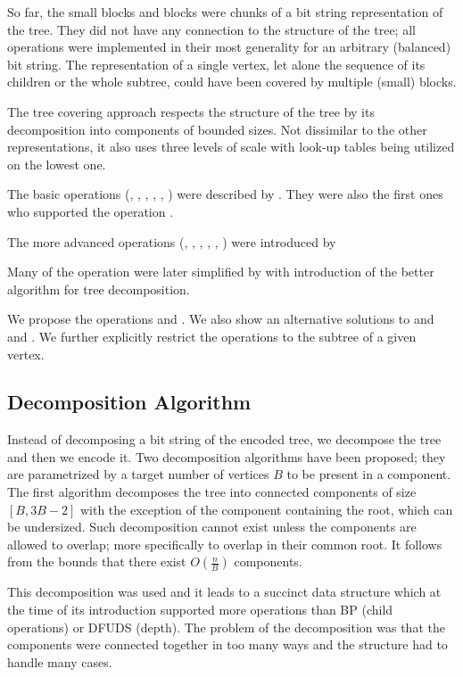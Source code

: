 So far, the small blocks and blocks were chunks of a bit string representation of the tree.
They did not have any connection to the structure of the tree; all operations were implemented in their most generality for an arbitrary (balanced) bit string.
The representation of a single vertex, let alone the sequence of its children or the whole subtree, could have been covered by multiple (small) blocks.

The tree covering approach respects the structure of the tree by its decomposition into components of bounded sizes.
Not dissimilar to the other representations, it also uses three levels of scale with look-up tables being utilized on the lowest one.

\bigbreak

The basic operations (\childAny{}, \degree{}, \dep{}, \subtreeSize{}, \preAny{}, \postAny{}) were described by \cite{geary2006succinct}.
They were also the first ones who supported the operation \levelAncestor{}.

The more advanced operations (\hei{}, \lca{}, \distance{}, \leafAny{}, \dfudsAny{}, \levelAny{}) were introduced by \cite{he2007succinct}

Many of the operation were later simplified by \cite{farzan2014uniform} with introduction of the better algorithm for tree decomposition.

We propose the operations \deepestVertex{} and \inAny{}.
We also show an alternative solutions to \hei{} and \levelFirst{} and \levelLast{}.
We further explicitly restrict the operations to the subtree of a given vertex.

\subsection{Decomposition Algorithm}

Instead of decomposing a bit string of the encoded tree, we decompose the tree and then we encode it.
Two decomposition algorithms have been proposed; they are parametrized by a target number of vertices $B$ to be present in a component.
The first algorithm \cite{geary2006succinct} decomposes the tree into connected components of size $[B, 3 B - 2]$ with the exception of the component containing the root, which can be undersized.
Such decomposition cannot exist unless the components are allowed to overlap; more specifically to overlap in their common root.
It follows from the bounds that there exist $O\left(\frac{n}{B}\right)$ components.

This decomposition was used and it leads to a succinct data structure which at the time of its introduction supported more operations than BP (child operations) or DFUDS (depth).
The problem of the decomposition was that the components were connected together in too many ways and the structure had to handle many cases.

